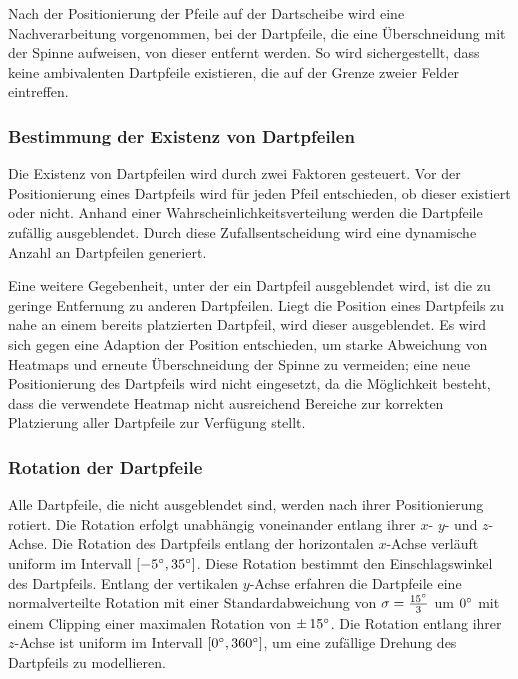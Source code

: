 Nach der Positionierung der Pfeile auf der Dartscheibe wird eine Nachverarbeitung vorgenommen, bei der Dartpfeile, die eine Überschneidung mit der Spinne aufweisen, von dieser entfernt werden. So wird sichergestellt, dass keine ambivalenten Dartpfeile existieren, die auf der Grenze zweier Felder eintreffen.

\subsubsection{Bestimmung der Existenz von Dartpfeilen}
\label{sec:dartpfeile_existenz}

Die Existenz von Dartpfeilen wird durch zwei Faktoren gesteuert. Vor der Positionierung eines Dartpfeils wird für jeden Pfeil entschieden, ob dieser existiert oder nicht. Anhand einer Wahrscheinlichkeitsverteilung werden die Dartpfeile zufällig ausgeblendet. Durch diese Zufallsentscheidung wird eine dynamische Anzahl an Dartpfeilen generiert.

Eine weitere Gegebenheit, unter der ein Dartpfeil ausgeblendet wird, ist die zu geringe Entfernung zu anderen Dartpfeilen. Liegt die Position eines Dartpfeils zu nahe an einem bereits platzierten Dartpfeil, wird dieser ausgeblendet. Es wird sich gegen eine Adaption der Position entschieden, um starke Abweichung von Heatmaps und erneute Überschneidung der Spinne zu vermeiden; eine neue Positionierung des Dartpfeils wird nicht eingesetzt, da die Möglichkeit besteht, dass die verwendete Heatmap nicht ausreichend Bereiche zur korrekten Platzierung aller Dartpfeile zur Verfügung stellt.

\subsubsection{Rotation der Dartpfeile}
\label{sec:dartpfeile_rotation}

Alle Dartpfeile, die nicht ausgeblendet sind, werden nach ihrer Positionierung rotiert. Die Rotation erfolgt unabhängig voneinander entlang ihrer $x$- $y$- und $z$-Achse. Die Rotation des Dartpfeils entlang der horizontalen $x$-Achse verläuft uniform im Intervall $[-5^{\circ}, 35^{\circ}]$. Diese Rotation bestimmt den Einschlagswinkel des Dartpfeils. Entlang der vertikalen $y$-Achse erfahren die Dartpfeile eine normalverteilte Rotation mit einer Standardabweichung von $\sigma = \frac{15^{\circ}}{3}$ um $0^{\circ}$ mit einem Clipping einer maximalen Rotation von $\pm\,15^{\circ}$. Die Rotation entlang ihrer $z$-Achse ist uniform im Intervall $[0^{\circ}, 360^{\circ}]$, um eine zufällige Drehung des Dartpfeils zu modellieren.

